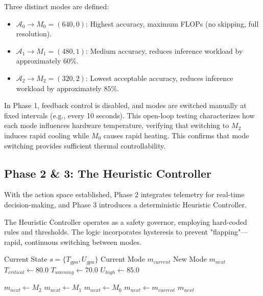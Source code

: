 \documentclass{ieeeaccess}
\begin{document}
Three distinct modes are defined:
\begin{itemize}
    \item $\mathcal{A}_0 \rightarrow M_0 = (640, 0)$: Highest accuracy, maximum FLOPs (no skipping, full resolution).
    \item $\mathcal{A}_1 \rightarrow M_1 = (480, 1)$: Medium accuracy, reduces inference workload by approximately $60\%$.
    \item $\mathcal{A}_2 \rightarrow M_2 = (320, 2)$: Lowest acceptable accuracy, reduces inference workload by approximately $85\%$.
\end{itemize}

In Phase 1, feedback control is disabled, and modes are switched manually at fixed intervals (e.g., every 10 seconds). This open-loop testing characterizes how each mode influences hardware temperature, verifying that switching to $M_2$ induces rapid cooling while $M_0$ causes rapid heating. This confirms that mode switching provides sufficient thermal controllability.

\subsection{Phase 2 \& 3: The Heuristic Controller}
With the action space established, Phase 2 integrates telemetry for real-time decision-making, and Phase 3 introduces a deterministic Heuristic Controller.

The Heuristic Controller operates as a safety governor, employing hard-coded rules and thresholds. The logic incorporates hysteresis to prevent "flapping"—rapid, continuous switching between modes.

\begin{algorithm}
\caption{Heuristic Control Logic}\label{alg:heuristic}
\begin{algorithmic}[1]
\Require Current State $s = \{T_{gpu}, U_{gpu}\}$
\Require Current Mode $m_{current}$
\Ensure New Mode $m_{next}$
\State $T_{critical} \gets 80.0$
\State $T_{warning} \gets 70.0$
\State $U_{high} \gets 85.0$

    \State $m_{next} \gets M_2$ 
    \State $m_{next} \gets M_1$ 
\Else
        \State $m_{next} \gets M_0$ 
    \Else
        \State $m_{next} \gets m_{current}$
    \EndIf
\EndIf
\State \Return $m_{next}$
\end{algorithmic}
\end{algorithm}
\end{document}
